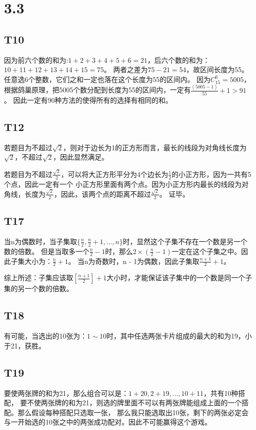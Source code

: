 \documentclass{article}
\begin{document}
\section{3.3}
\subsection{T10}
因为前六个数的和为:$1+2+3+4+5+6 = 21$，后六个数的和为：$10+11+12+13+14+15 = 75$。
两者之差为$75 - 21 = 54$，故区间长度为55。任意选6个整数，它们之和一定也落在这个长度为55的区间内。
因为$C_15^6 = 5005$，根据鸽巢原理，把5005个数分配到长度为55的区间内，一定有$\frac{(5005 - 1)}{55} + 1 > 91$。
因此一定有90种方法的使得所有的选择有相同的和。
\subsection{T12}
若题目为不超过$\sqrt{2}$，则对于边长为1的正方形而言，最长的线段为对角线长度为$\sqrt{2}$，不超过$\sqrt{2}$，因此显然满足。

若题目为不超过$\frac{\sqrt{2}}{2}$，可以将大正方形平分为4个边长为$\frac{1}{2}$的小正方形，因为一共有5个点，因此一定有一个
小正方形里面有两个点。因为小正方形内最长的线段为对角线，长度为$\frac{\sqrt{2}}{2}$，因此，该两个点的距离不超过$\frac{\sqrt{2}}{2}$。
证毕。
\subsection{T17}
当n为偶数时，当子集取$\{\frac{n}{2}, \frac{n}{2} + 1, \dots, n\}$时，显然这个子集不存在一个数是另一个数的倍数。
但是当取多一个$\frac{n}{2} - 1$时，那么$2 \times \left(\frac{n}{2} - 1\right)$一定在这个子集之中。因此子集大小为：$\frac{n}{2} + 1$。
当n为奇数时，n - 1为偶数，因此子集取$\frac{n + 1}{2} + 1$。

综上所述：子集应该取$\left[\frac{n + 1}{2}\right] + 1$大小时，才能保证该子集中的一个数是同一个子集的另一个数的倍数。

\subsection{T18}
有可能，当选出的10张为：$1 \sim 10$时，其中任选两张卡片组成的最大的和为19，小于21，获胜。

\subsection{T19}
要使两张牌的和为21，那么组合可以是：$1 + 20, 2 + 19, \dots, 10 + 11$，共有10种搭配，
要不使两张牌的和为21，则选的牌里面不可以有两张牌能组成上面的一个搭配。那么假设每种搭配只选取一张，
那么我只能选取出10张，剩下的两张必定会与一开始选的10张之中的两张成功配对。因此不可能赢得这个游戏。
\end{document}
